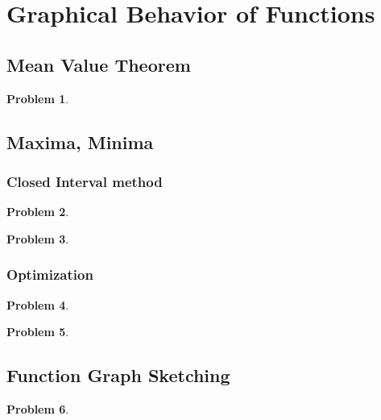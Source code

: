 \documentclass{article}
\newtheorem{problem}{Problem}
\begin{document}
\section{Graphical Behavior of Functions}
\subsection{Mean Value Theorem}\label{secMPS-MVT}
\begin{problem}

\end{problem}



\subsection{Maxima, Minima}\label{secMPSoneVariableMinMax}
\subsubsection{Closed Interval method}\label{secMPSclosedInterval}
\begin{problem}

\end{problem}


\begin{problem}

\end{problem}

\subsubsection{Optimization}\label{secMPSoptimization}
\begin{problem}

\end{problem}
\begin{problem}

\end{problem}


\subsection{Function Graph Sketching}\label{secMPSfunctionGraphSketching}
\begin{problem}

\end{problem}

\end{document}
